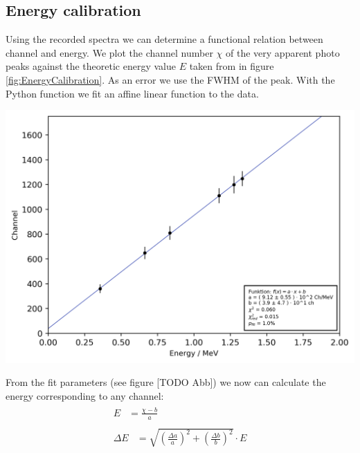 \subsection{Energy calibration}
%
Using the recorded spectra we can determine a functional relation between channel and energy.
We plot the channel number $\chi$ of the very apparent photo peaks against the theoretic energy value $E$ taken from \cite{Anleitung} in figure \ref{fig:EnergyCalibration}.
As an error we use the FWHM of the peak.
With the  Python function we fit an affine linear function to the data.
%
\begin{multicolfloat}
    \includegraphics[width=\linewidth]{png/energy_calibration}
    \label{fig:EnergyCalibration}
\end{multicolfloat}
%
From the fit parameters (see figure [TODO Abb]) we now can calculate the energy corresponding to any channel:
\begin{align}
    \label{eq:}
    \begin{split}
        E &= \frac{\chi - b}{a}
    \end{split}
    \\
    \label{eq:}
    \begin{split}
        \Delta E &= \sqrt{ \left ( \frac{ \Delta a}{ a } \right ) ^2 + \left ( \frac{\Delta b}{b} \right ) ^2 } \cdot E
    \end{split}
\end{align}
%

